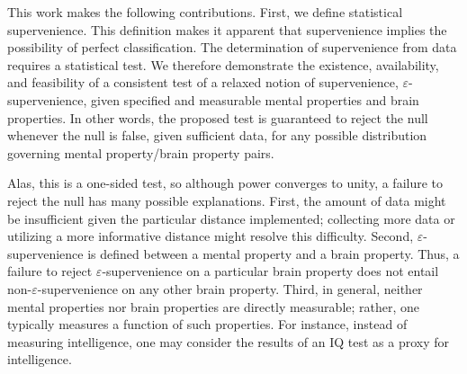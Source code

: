 \documentclass{article}
\newcommand{\eps}{\varepsilon}
\begin{document}
This work makes the following contributions.  First, we define statistical supervenience.  This definition makes it apparent that supervenience implies the possibility of perfect classification.  The determination of supervenience from data requires a statistical test.  We therefore demonstrate the existence, availability, and feasibility of a consistent test of a relaxed notion of supervenience, $\eps$-supervenience, given specified and measurable mental properties and brain properties.  In other words, the proposed test is guaranteed to reject the null whenever the null is false, given sufficient data, for any possible distribution governing mental property/brain property pairs. 


Alas, this is a one-sided test, so although power converges to unity, %
a failure to reject the null has many possible explanations.  First, the amount of data might be insufficient given the particular distance implemented; collecting more data or utilizing a more informative distance might resolve this difficulty.  Second, $\eps$-supervenience is defined between a mental property and a brain property.  Thus, a failure to reject $\eps$-supervenience on a particular brain property does not entail non-$\eps$-supervenience on any other brain property.  Third, in general, neither mental properties nor brain properties are directly measurable; rather, one typically measures a function of such properties.  For instance, instead of measuring intelligence, one may consider the results of an IQ test as a proxy for intelligence. 

\end{document}
